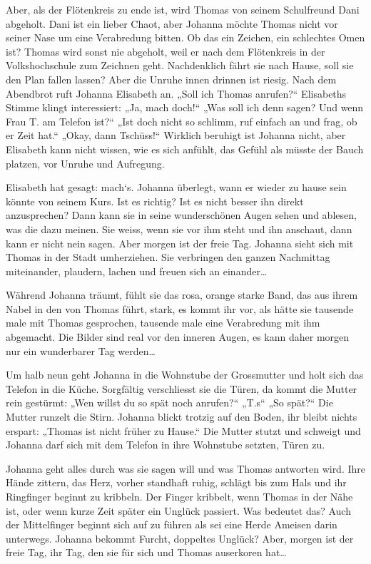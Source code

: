 \documentclass[10pt,titlepage,a5paper]{book}
\begin{document}
Aber, als der Flötenkreis zu ende ist, wird Thomas von seinem Schulfreund Dani abgeholt. Dani ist ein lieber Chaot, aber Johanna möchte Thomas nicht vor seiner Nase um eine Verabredung bitten. Ob das ein Zeichen, ein schlechtes Omen ist? Thomas wird sonst nie abgeholt, weil er nach dem Flötenkreis in der Volkshochschule zum Zeichnen geht. Nachdenklich fährt sie nach Hause, soll sie den Plan fallen lassen? Aber die Unruhe innen drinnen ist riesig. Nach dem Abendbrot ruft Johanna Elisabeth an. „Soll ich Thomas anrufen?“ Elisabeths Stimme klingt interessiert: „Ja, mach doch!“ „Was soll ich denn sagen? Und wenn Frau T. am Telefon ist?“ „Ist doch nicht so schlimm, ruf einfach an und frag, ob er Zeit hat.“ „Okay, dann Tschüss!“ Wirklich beruhigt ist Johanna nicht, aber Elisabeth kann nicht wissen, wie es sich anfühlt, das Gefühl als müsste der Bauch platzen, vor Unruhe und Aufregung.

Elisabeth hat gesagt: mach`s. Johanna überlegt, wann er wieder zu hause sein könnte von seinem Kurs. Ist es richtig? Ist es nicht besser ihn direkt anzusprechen? Dann kann sie in seine wunderschönen Augen sehen und ablesen, was die dazu meinen. Sie weiss, wenn sie vor ihm steht und ihn anschaut, dann kann er nicht nein sagen. Aber morgen ist der freie Tag. Johanna  sieht sich mit Thomas in der Stadt umherziehen. Sie verbringen den ganzen Nachmittag miteinander, plaudern, lachen und freuen sich an einander\dots 

Während Johanna träumt, fühlt sie das rosa, orange starke Band, das aus ihrem Nabel in den von Thomas führt, stark, es kommt ihr vor, als hätte sie tausende male mit Thomas gesprochen, tausende male eine Verabredung mit ihm abgemacht. Die Bilder sind real vor den inneren Augen, es kann daher morgen nur ein wunderbarer Tag werden\dots 

Um halb neun geht Johanna in die Wohnstube der Grossmutter und holt sich das Telefon in die Küche. Sorgfältig verschliesst sie die Türen, da kommt die Mutter rein gestürmt: „Wen willst du so spät noch anrufen?“ „T.s“ „So spät?“ Die Mutter runzelt die Stirn. Johanna blickt trotzig auf den Boden, ihr bleibt nichts erspart: „Thomas ist nicht früher zu Hause.“ Die Mutter stutzt und schweigt und Johanna darf sich mit dem Telefon in ihre Wohnstube setzten, Türen zu.

Johanna geht alles durch was sie sagen will und was Thomas antworten wird. Ihre Hände zittern, das Herz, vorher standhaft ruhig, schlägt bis zum Hals und ihr Ringfinger beginnt zu kribbeln. Der Finger kribbelt, wenn Thomas in der Nähe ist, oder wenn kurze Zeit später ein Unglück passiert. Was bedeutet das? Auch der Mittelfinger beginnt sich auf zu führen  als sei eine Herde Ameisen darin unterwegs. Johanna bekommt Furcht, doppeltes Unglück? Aber, morgen ist der freie Tag, ihr Tag, den sie für sich und Thomas auserkoren hat\dots 
\end{document}
